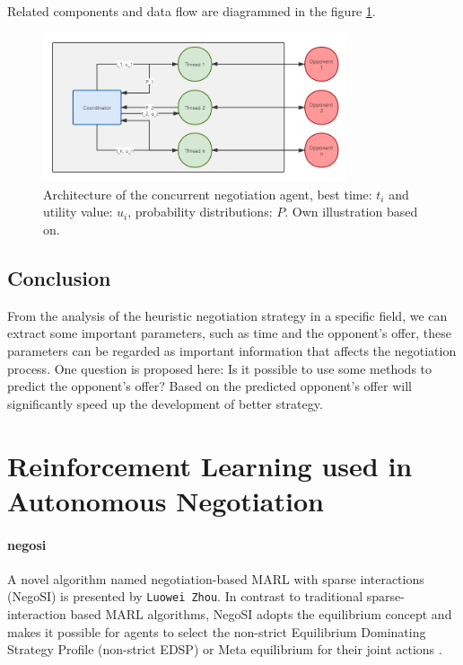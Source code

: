 Related components and data flow are diagrammed in the figure \ref{fig:heuristic-concurrent-negotiation}.
\begin{figure}[htbp]
\centering
\includegraphics[width=0.8\textwidth]{./images/heuristic_concurrent_negotiation.png}
\caption{Architecture of the concurrent negotiation agent, best time: $t_i$ and utility value: $u_i$, probability distributions: $P$. Own illustration based on\parencite{Williams12Concurrent}.}
\label{fig:heuristic-concurrent-negotiation}
\end{figure}

\subsection{Conclusion}
From the analysis of the heuristic negotiation strategy in a specific field, we can extract some important parameters, such as time and the opponent's offer, these parameters can be regarded as important information that affects the negotiation process. One question is proposed here: Is it possible to use some methods to predict the opponent’s offer? Based on the predicted opponent's offer will significantly speed up the development of better strategy.

\section{Reinforcement Learning used in Autonomous Negotiation}
\paragraph{\gls{negosi}} A novel algorithm named negotiation-based MARL
with sparse interactions (NegoSI) is presented by \texttt{Luowei Zhou}. In contrast to traditional sparse-interaction based MARL algorithms, NegoSI adopts the equilibrium concept and makes it possible for agents to select the non-strict Equilibrium Dominating Strategy Profile (non-strict EDSP) or Meta equilibrium for their joint actions \parencite{L2017NegoSI}.

